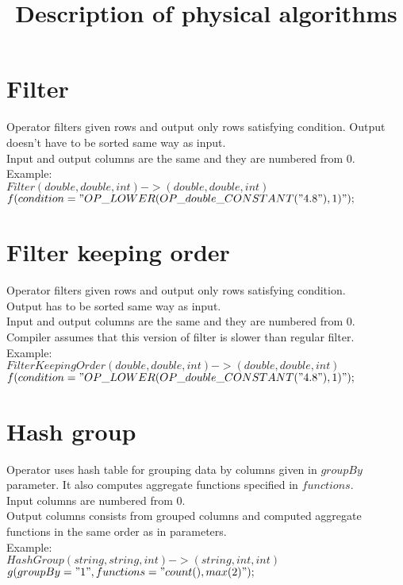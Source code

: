 \documentclass{article}
\begin{document}
\title{Description of physical algorithms}

\maketitle

\section{Filter}
Operator filters given rows and output only rows satisfying condition.
Output doesn't have to be sorted same way as input. \\
Input and output columns are the same and they are numbered from 0.\\
Example: \\
$Filter(double,double,int)->(double,double,int)$\\
$f(condition="OP\_LOWER(OP\_double\_CONSTANT("4.8"),1)"); $\\


\section{Filter keeping order}
Operator filters given rows and output only rows satisfying condition.\\
Output has to be sorted same way as input. \\
Input and output columns are the same and they are numbered from 0.\\
Compiler assumes that this version of filter is slower than regular filter.\\
Example: \\
$FilterKeepingOrder(double,double,int)->(double,double,int)$ \\
$f(condition="OP\_LOWER(OP\_double\_CONSTANT("4.8"),1)"); $ \\

\section{Hash group}
Operator uses hash table for grouping data by columns given in $groupBy$ parameter.
It also computes aggregate functions specified in $functions$.\\
Input columns are numbered from 0.\\
Output columns consists from grouped columns and computed aggregate functions in the same order as in parameters.\\
Example: \\  
$HashGroup(string,string,int)->(string,int,int)$ \\
$g(groupBy="1",functions="count(),max(2)");$ \\
\end{document}
